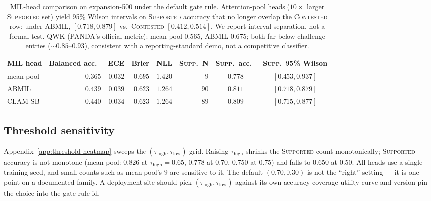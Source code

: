 \documentclass{article}
\newcommand{\SafeNum}[1]{#1}
\newcommand{\AggNum}[2]{#2}
\begin{document}
\begin{table}[t]
\centering
\caption{MIL-head comparison on expansion-500 under the default gate rule. Attention-pool heads ($\SafeNum{10}\times$ larger \textsc{Supported} set) yield \SafeNum{95\%} Wilson intervals on \textsc{Supported} accuracy that no longer overlap the \textsc{Contested} row: under ABMIL, $[\AggNum{abmil.supported.wilson.lo}{0.718}, \AggNum{abmil.supported.wilson.hi}{0.879}]$ vs.\ \textsc{Contested} $[\AggNum{abmil.contested.wilson.lo}{0.412}, \AggNum{abmil.contested.wilson.hi}{0.514}]$. We report interval separation, not a formal test. QWK (PANDA's official metric): mean-pool $\SafeNum{0.565}$, ABMIL $\SafeNum{0.675}$; both far below challenge entries ($\sim\SafeNum{0.85}$--$\SafeNum{0.93}$), consistent with a reporting-standard demo, not a competitive classifier.}
\label{tab:mil-comparison}
\setlength{\tabcolsep}{4pt}
\small
\begin{tabular}{@{}lrrrrrcc@{}}
\toprule
MIL head & Balanced acc.\ & ECE & Brier & NLL & \textsc{Supp.}\ N & \textsc{Supp.}\ acc.\ & \textsc{Supp.}\ \SafeNum{95\%} Wilson\\
\midrule
mean-pool & $\SafeNum{0.365}$ & $\SafeNum{0.032}$ & $\SafeNum{0.695}$ & $\SafeNum{1.420}$ & $\AggNum{meanpool.supported.n}{9}$   & $\AggNum{meanpool.supported.acc}{0.778}$ & $[\AggNum{meanpool.supported.wilson.lo}{0.453}, \AggNum{meanpool.supported.wilson.hi}{0.937}]$ \\
ABMIL     & $\SafeNum{0.439}$ & $\SafeNum{0.039}$ & $\SafeNum{0.623}$ & $\SafeNum{1.264}$ & $\AggNum{abmil.supported.n}{90}$  & $\AggNum{abmil.supported.acc}{0.811}$ & $[\AggNum{abmil.supported.wilson.lo}{0.718}, \AggNum{abmil.supported.wilson.hi}{0.879}]$ \\
CLAM-SB   & $\SafeNum{0.440}$ & $\SafeNum{0.034}$ & $\SafeNum{0.623}$ & $\SafeNum{1.264}$ & $\SafeNum{89}$  & $\SafeNum{0.809}$ & $[\SafeNum{0.715}, \SafeNum{0.877}]$ \\
\bottomrule
\end{tabular}
\end{table}

\subsection{Threshold sensitivity}
\label{sec:threshold-sens}

Appendix~\ref{app:threshold-heatmap} sweeps the $(\tau_{\text{high}}, \tau_{\text{low}})$ grid. Raising $\tau_{\text{high}}$ shrinks the \textsc{Supported} count monotonically; \textsc{Supported} accuracy is not monotone (mean-pool: $\SafeNum{0.826}$ at $\tau_{\text{high}}{=}\SafeNum{0.65}$, $\SafeNum{0.778}$ at $\SafeNum{0.70}$, $\SafeNum{0.750}$ at $\SafeNum{0.75}$) and falls to $\SafeNum{0.650}$ at $\SafeNum{0.50}$. All heads use a single training seed, and small counts such as mean-pool's $\SafeNum{9}$ are sensitive to it. The default $(\SafeNum{0.70}, \SafeNum{0.30})$ is not the ``right'' setting --- it is one point on a documented family. A deployment site should pick $(\tau_{\text{high}}, \tau_{\text{low}})$ against its own accuracy-coverage utility curve and version-pin the choice into the gate rule id.
\end{document}
